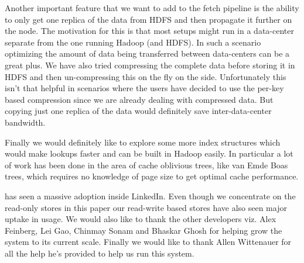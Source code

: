 \documentclass[10pt,twocolumn,preprint,natbib,authoryear]{sigplanconf}
\begin{document}
Another important feature that we want to add to the fetch pipeline is the ability to only get one replica of the data from HDFS and then propagate it further on the \projectname{} node. The motivation for this is that most \projectname{} setups might run in a data-center separate from the one running Hadoop (and HDFS). In such a scenario optimizing the amount of data being transferred between data-centers can be a great plus. We have also tried compressing the complete data before storing it in HDFS and then un-compressing this on the fly on the \projectname{} side. Unfortunately this isn't that helpful in scenarios where the users have decided to use the per-key based compression since we are already dealing with compressed data. But copying just one replica of the data would definitely save inter-data-center bandwidth. 

Finally we would definitely like to explore some more index structures which would make lookups faster and can be built in Hadoop easily. In particular a lot of work has been done in the area of cache oblivious trees, like van Emde Boas trees, which requires no knowledge of page size to get optimal cache performance. 
 
\acks
\projectname{} has seen a massive adoption inside LinkedIn. Even though we concentrate on the read-only stores in this paper our read-write based stores have also seen major uptake in usage. We would also like to thank the other \projectname{} developers viz. Alex Feinberg, Lei Gao, Chinmay Sonam and Bhaskar Ghosh for helping grow the system to its current scale. Finally we would like to thank Allen Wittenauer for all the help he's provided to help us run this system. 


\end{document}
